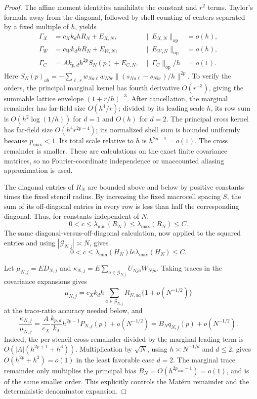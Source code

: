 \documentclass{article}
\begin{document}
\begin{proof}
The affine moment identities annihilate the constant and \(r^2\) terms.  Taylor's formula away from the diagonal, followed by shell counting of centers separated by a fixed multiple of \(h\), yields
\[
 \begin{aligned}
 \Gamma_X&=c_Xk_dhR_N+E_{X,N},&
 \|E_{X,N}\|_{\mathrm{op}}&=o(h),\\
 \Gamma_W&=c_Wk_dhR_N+E_{W,N},&
 \|E_{W,N}\|_{\mathrm{op}}&=o(h),\\
 \Gamma_C&=Ak_{p,d}h^{2p}S_N(p)+E_{C,N},&
 \|\Gamma_C\|_{\mathrm{op}}/h&=o(1).
 \end{aligned}
\]
Here \(S_N(p)_{ab}=-\sum_{\ell,r}w_{Na\ell}w_{Nbr}
\|(s_{Na\ell}-s_{Nbr})/h\|^{2p}\).  To verify the orders, the principal marginal kernel has fourth derivative \(O(r^{-3})\), giving the summable lattice envelope \((1+r/h)^{-3}\).  After cancellation, the marginal remainder has far-field size \(O(h^4/r)\); divided by its leading scale \(h\), its row sum is \(O(h^2\log(1/h))\) for \(d=1\) and \(O(h)\) for \(d=2\).  The principal cross kernel has far-field size \(O(h^4r^{2p-4})\); its normalized shell sum is bounded uniformly because \(p_{\max}<1\).  Its total scale relative to \(h\) is \(h^{2p-1}=o(1)\).  The cross remainder is smaller.  These are calculations on the exact finite covariance matrices, so no Fourier-coordinate independence or unaccounted aliasing approximation is used.

The diagonal entries of \(R_N\) are bounded above and below by positive constants times the fixed stencil radius.  By increasing the fixed macrocell spacing \(S\), the sum of its off-diagonal entries in every row is less than half the corresponding diagonal.  Thus, for constants independent of \(N\),
\[
 0<c\le\lambda_{\min}(R_N)\le\lambda_{\max}(R_N)\le C.
\]
The same diagonal-versus-off-diagonal calculation, now applied to the squared entries and using \(|\mathcal G_{N,j}|\asymp N\), gives
\[
 0<c\le\lambda_{\min}(H_N)le\lambda_{\max}(H_N)\le C.
\]

Let \(\mu_{N,j}=E D_{N,j}\) and \(\kappa_{N,j}=E\sum_{a\in\mathcal G_{N,j}}U_{Nja}W_{Nja}\).  Taking traces in the covariance expansions gives
\[
 \mu_{N,j}=c_Xk_dh\sum_{a\in\mathcal G_{N,j}}R_{N,aa}\{1+o(N^{-1/2})\}
\]
at the trace-ratio accuracy needed below, and
\[
 \frac{\kappa_{N,j}}{\mu_{N,j}}
 =\frac{A}{c_X}\frac{k_{p,d}}{k_d}h^{2p-1}P_{N,j}(p)+o(N^{-1/2})
 =B_Nq_{N,j}(p)+o(N^{-1/2}).
\]
Indeed, the per-stencil cross remainder divided by the marginal leading term is \(O(|A|(h^{2p+1}+h^3))\).  Multiplication by \(\sqrt N\), using \(h\asymp N^{-1/d}\) and \(d\le2\), gives \(O(h^{2p}+h^2)=o(1)\) in the least favorable case \(d=2\).  The marginal trace remainder only multiplies the principal bias \(B_N=O(h^{2p_{\min}-1})=o(1)\), and is of the same smaller order.  This explicitly controls the Mat\'ern remainder and the deterministic denominator expansion.


\end{proof}
\end{document}

